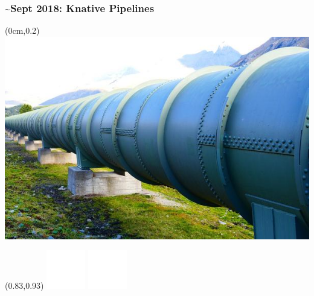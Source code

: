 \documentclass[aspectratio=169,11pt,hyperref={colorlinks=true}]{beamer}
\begin{document}
\begin{lblackrwhiteframe}
\begin{blackframe}
  \frametitle{\textasciitilde Sept 2018: Knative Pipelines}
  \begin{textblock*}{\paperwidth}(0cm,0.2\paperheight)
    \includegraphics[width=\paperwidth]{img/pipeline_cc0.jpg}
  \end{textblock*}
  \begin{textblock*}{0.2\paperwidth}(0.83\paperwidth,0.93\paperheight)
    \includegraphics[width=0.03\paperwidth]{img/cc.png}
    \includegraphics[width=0.03\paperwidth]{img/zero.png}
  \end{textblock*}
\end{blackframe}


\end{lblackrwhiteframe}
\end{document}
